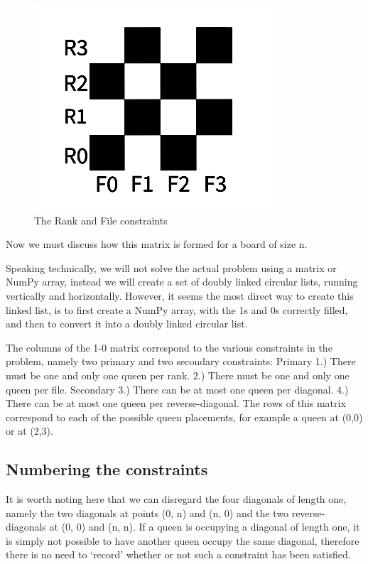 \documentclass{article}
\begin{document}
\begin{center}
\begin{figure}[ht]
\includegraphics[scale=1]{images/chess1.png}
\caption{The Rank and File constraints}
\label{fig: The Ranks and Files of a 4x4 Board}
\end{figure}
\end{center}
Now we must discuss how this matrix is formed for a board of size n.

Speaking technically, we will not solve the actual problem using a matrix or NumPy array, instead we will create a set of doubly linked circular lists, running vertically and horizontally. However, it seems the most direct way to create this linked list, is to first create a NumPy array, with the 1s and 0s correctly filled, and then to convert it into a doubly linked circular list.

The columns of the 1-0 matrix correspond to the various constraints in the problem, namely two primary and two secondary constraints:
	Primary
	1.) There must be one and only one queen per rank.
	2.) There must be one and only one queen per file.
	Secondary
	3.) There can be at most one queen per diagonal.
	4.) There can be at most one queen per reverse-diagonal.
The rows of this matrix correspond to each of the possible queen placements, for example a queen at (0,0) or at (2,3). 

\subsection{Numbering the constraints}
It is worth noting here that we can disregard the four diagonals of length one, namely the two diagonals at points (0, n) and (n, 0) and the two reverse-diagonals at (0, 0) and (n, n). If a queen is occupying a diagonal of length one, it is simply not possible to have another queen occupy the same diagonal, therefore there is no need to ‘record’ whether or not such a constraint has been satisfied.
\end{document}

